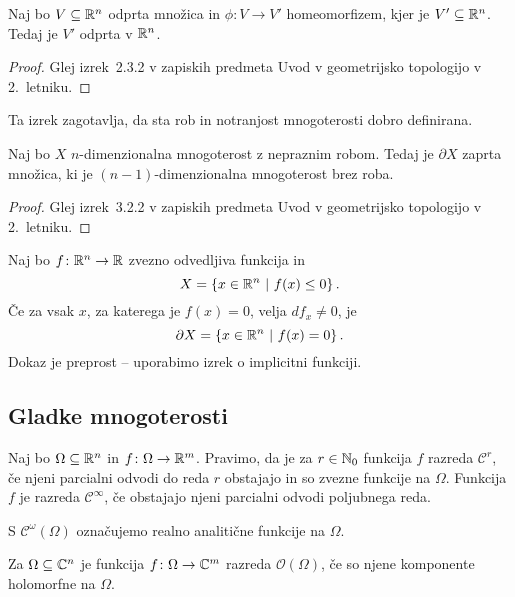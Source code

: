 \begin{izrek}[Brouwer]
Naj bo $V \subseteq \mathbb{R}^n$ odprta množica in $\phi \colon V \to V'$
homeomorfizem, kjer je $V' \subseteq \mathbb{R}^n$. Tedaj je $V'$ odprta v
$\mathbb{R}^n$.
\end{izrek}

\begin{proof}
Glej izrek~2.3.2 v zapiskih predmeta Uvod v geometrijsko topologijo
v 2.~letniku.
\end{proof}

\begin{opomba}
Ta izrek zagotavlja, da sta rob in notranjost mnogoterosti dobro
definirana.
\end{opomba}

\begin{trditev}
Naj bo $X$ $n$-dimenzionalna mnogoterost z nepraznim robom. Tedaj
je $\partial X$ zaprta množica, ki je $(n-1)$-dimenzionalna
mnogoterost brez roba.
\end{trditev}

\begin{proof}
Glej izrek~3.2.2 v zapiskih predmeta Uvod v geometrijsko topologijo
v 2.~letniku.
\end{proof}

\begin{primer}
Naj bo $f \colon \mathbb{R}^n \to \mathbb{R}$ zvezno odvedljiva funkcija in
\[
X = \left\{x \in \mathbb{R}^n~\middle\vert~f(x) \leq 0\right\}.
\]
Če za vsak $x$, za katerega je $f(x) = 0$, velja $df_x \ne 0$, je
\[
\partial X = \left\{x \in \mathbb{R}^n~\middle\vert~f(x) = 0\right\}.
\]
Dokaz je preprost -- uporabimo izrek o implicitni funkciji.
\end{primer}

\newpage

\subsection{Gladke mnogoterosti}

\begin{definicija}
Naj bo $\Omega \subseteq \mathbb{R}^n$ in $f \colon \Omega \to \mathbb{R}^m$.
Pravimo, da je za $r \in \mathbb{N}_0$ funkcija $f$ razreda
$\mathcal{C}^r$, če njeni parcialni odvodi do reda $r$ obstajajo in
so zvezne funkcije na $\Omega$. Funkcija $f$ je razreda
$\mathcal{C}^\infty$, če obstajajo njeni parcialni odvodi
poljubnega reda.

S $\mathcal{C}^\omega(\Omega)$ označujemo realno analitične
funkcije na $\Omega$.

Za $\Omega \subseteq \mathbb{C}^n$ je funkcija $f \colon \Omega \to \mathbb{C}^m$
razreda $\mathcal{O}(\Omega)$, če so njene komponente holomorfne na
$\Omega$.
\end{definicija}

